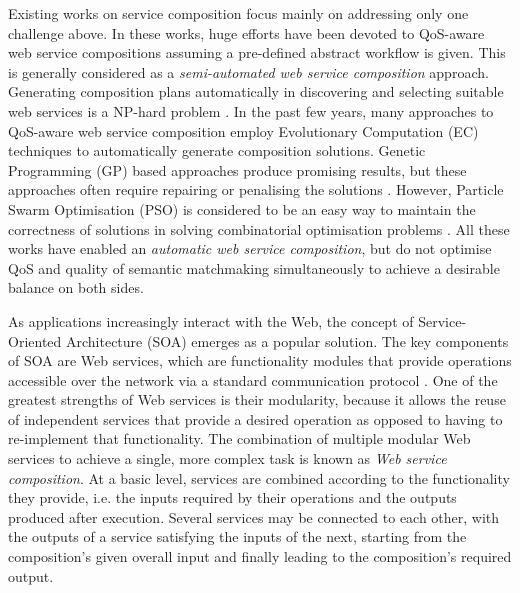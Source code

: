 Existing works on service composition focus mainly on addressing only one challenge above. In these works, huge efforts have been devoted to QoS-aware web service compositions assuming a pre-defined abstract workflow is given. This is generally considered as a \textit{semi-automated web service composition} approach. Generating composition plans automatically in discovering and selecting suitable web services is a NP-hard problem \cite{moghaddam2014service}. In the past few years, many approaches \cite{gupta2015optimization,ma2015hybrid,qi2010combining,da2016particle,da2015graphevol,yu2013adaptive} to QoS-aware web service composition employ Evolutionary Computation (EC) techniques to automatically generate composition solutions. Genetic Programming (GP) based approaches produce promising results, but these approaches often require repairing or penalising the solutions \cite{ma2015hybrid,yu2013adaptive}. However, Particle Swarm Optimisation (PSO) is considered to be an easy way to maintain the correctness of solutions in solving combinatorial optimisation problems \cite{da2016particle}. All these works have enabled an \textit{automatic web service composition}, but do not optimise QoS and quality of semantic matchmaking simultaneously to achieve a desirable balance on both sides.




As applications increasingly interact with the Web, the concept of Service-Oriented Architecture (SOA) \cite{perrey2003service}
emerges as a popular solution. The key components of SOA are Web services, which are functionality modules that
provide operations accessible over the network via a standard communication protocol \cite{gottschalk2002introduction}. One of the greatest strengths of Web services is their modularity, because it allows the reuse of independent services that provide a
desired operation as opposed to having to re-implement that functionality. The combination of multiple modular Web services
to achieve a single, more complex task is known as \textit{Web service composition}. At a basic level, services are combined according to the functionality they provide, i.e. the inputs required by their operations and the outputs produced after execution. Several services may be connected to each other, with the outputs of a service satisfying the inputs of the next, starting from the composition's given overall input and finally leading to the composition's required output.

